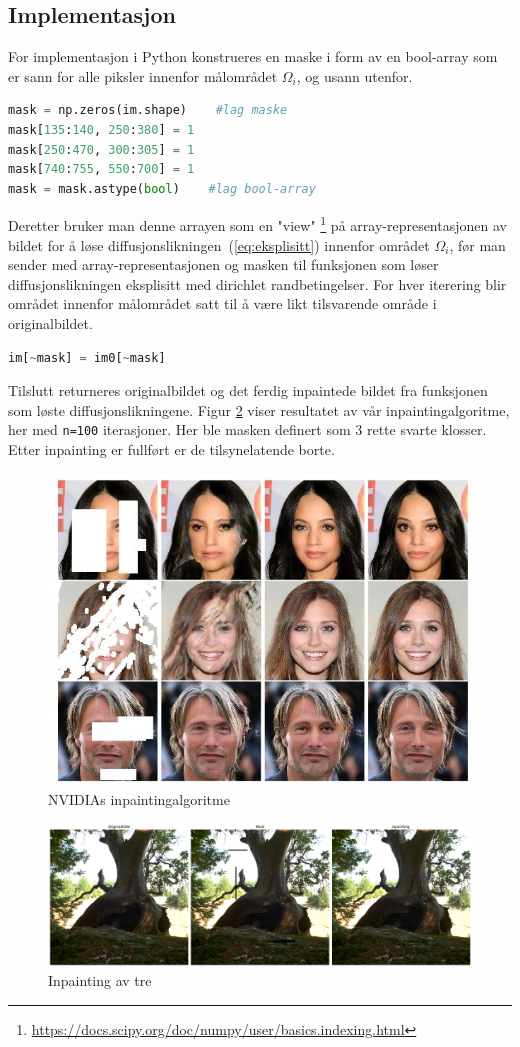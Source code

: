  \subsection{Implementasjon}
 For implementasjon i Python konstrueres en maske i form av en bool-array som er sann for alle piksler innenfor målområdet $\Omega_i$, og usann utenfor.

\begin{lstlisting}[language=Python]
mask = np.zeros(im.shape)    #lag maske
mask[135:140, 250:380] = 1
mask[250:470, 300:305] = 1
mask[740:755, 550:700] = 1
mask = mask.astype(bool)    #lag bool-array
\end{lstlisting}
 
Deretter bruker man denne arrayen som en "view" \footnote{\url{https://docs.scipy.org/doc/numpy/user/basics.indexing.html}} på array-representasjonen av bildet for å løse diffusjonslikningen~(\ref{eq:eksplisitt}) innenfor området $\Omega_i$, før man sender med array-representasjonen og masken til funksjonen som løser diffusjonslikningen eksplisitt med dirichlet randbetingelser. For hver iterering blir området innenfor målområdet satt til å være likt tilsvarende område i originalbildet.
\begin{lstlisting}[language=Python]
    im[~mask] = im0[~mask]
\end{lstlisting}
Tilslutt returneres originalbildet og det ferdig inpaintede bildet fra funksjonen som løste diffusjonslikningene. Figur \ref{fig:inpaint} viser resultatet av vår inpaintingalgoritme, her med \texttt{n=100} iterasjoner. Her ble masken definert som 3 rette svarte klosser. Etter inpainting er fullført er de tilsynelatende borte. 
\begin{figure}
\begin{center}
    \includegraphics[width=0.6\columnwidth]{bilder/nvidia-image-inpainting-demo.jpg}
    \caption{NVIDIAs inpaintingalgoritme~ \label{fig:nvidia}}
\end{center}
\end{figure}

\begin{figure}
\begin{center}
    \includegraphics[width=1\columnwidth]{bilder/tree_inpaint.png}
    \caption{Inpainting av tre~ \label{fig:inpaint}}
\end{center}
\end{figure}
